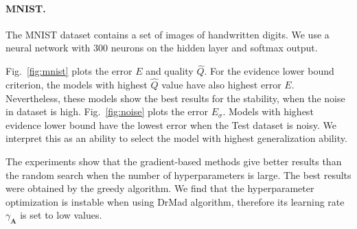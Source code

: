 \documentclass[smallcondensed]{svjour3}
\begin{document}
\paragraph{MNIST.}
The MNIST dataset contains a set of images of handwritten digits. 
We use a neural network with 300 neurons on the hidden layer and softmax output.


Fig.~\ref{fig:mnist} plots the error $E$ and quality $\hat{Q}$.
For the evidence lower bound criterion, the models with highest $\hat{Q}$ value have also highest error $E$. Nevertheless, 
these models show the best results for the stability, when the noise in dataset is high. Fig.~\ref{fig:noise} plots  the error $E_\sigma$. Models with highest evidence lower bound have the lowest error when the Test dataset is noisy. We interpret this as an ability to select the model with highest generalization ability.

The experiments show that the gradient-based methods give better results than the random search when the number of hyperparameters is large. The best results were obtained by the greedy algorithm. We find that the hyperparameter optimization is instable when using DrMad algorithm, therefore its learning rate  $\gamma_{\mathbf{A}}$ is set to low values.
\end{document}
